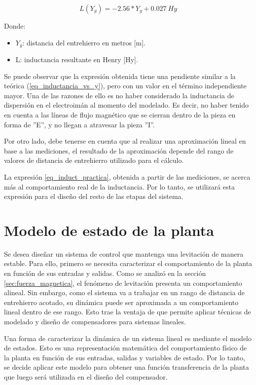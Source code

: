 \begin{equation}
	\label{eq_induct_practica}
	L(Y_g)=-2.56*Y_{g}+0.027\:Hy
\end{equation}

\noindent Donde:
\begin{itemize}
	\item $Y_{g}$: distancia del entrehierro en metros [m].
	\item L: inductancia resultante en Henry [Hy].
\end{itemize}

Se puede observar que la expresión obtenida tiene una pendiente similar a la teórica (\ref{eq_inductancia_vs_y}), pero con un valor en el término independiente mayor. Una de las razones de ello es no haber considerado la inductancia de dispersión en el electroimán al momento del modelado. Es decir, no haber tenido en cuenta a las líneas de flujo magnético que se cierran dentro de la pieza en forma de ”E”, y no llegan a atravesar la pieza ”I”.  

Por otro lado, debe tenerse en cuenta que al realizar una aproximación lineal en base a las mediciones, el resultado de la aproximación depende del rango de valores de distancia de entrehierro utilizado para el cálculo. 

La expresión \ref{eq_induct_practica}, obtenida a partir de las mediciones, se acerca más al comportamiento real de la inductancia. Por lo tanto, se utilizará esta expresión para el diseño del resto de las etapas del sistema. 


\section{Modelo de estado de la planta}

Se desea diseñar un sistema de control que mantenga una levitación de manera estable. Para ello, primero se necesita caracterizar el comportamiento de la planta en función de sus entradas y salidas. Como se analizó en la sección \ref{sec:fuerza_magnetica}, el fenómeno de levitación presenta un comportamiento alineal. Sin embargo, como el sistema va a trabajar en un rango de distancia de entrehierro acotado, su dinámica puede ser aproximada a un comportamiento lineal dentro de ese rango. Esto trae la ventaja de que permite aplicar técnicas de modelado y diseño de compensadores para sistemas lineales.

Una forma de caracterizar la dinámica de un sistema lineal es mediante el modelo de estados. Esto es una representación matemática del comportamiento físico de la planta en función de sus entradas, salidas y variables de estado. Por lo tanto, se decide aplicar este modelo para obtener una función transferencia de la planta que luego será utilizada en el diseño del compensador.


